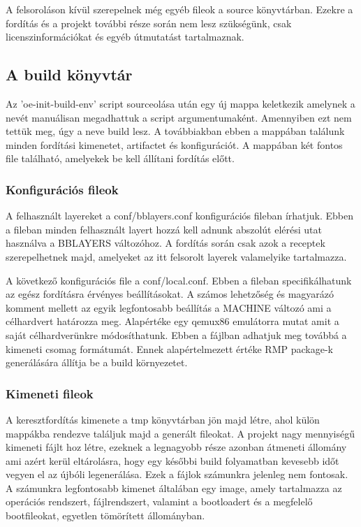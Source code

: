 A felsoroláson kívül szerepelnek még egyéb fileok a source könyvtárban. Ezekre a fordítás és a projekt további része során nem lesz szükségünk, csak licenszinformációkat és egyéb útmutatást tartalmaznak.

\subsection{A build könyvtár}

Az 'oe-init-build-env' script sourceolása után egy új mappa keletkezik amelynek a nevét manuálisan megadhattuk a script argumentumaként. Amennyiben ezt nem tettük meg, úgy a neve build lesz. A továbbiakban ebben a
mappában találunk minden fordítási kimenetet, artifactet és konfigurációt. A mappában két fontos file található, amelyekek be kell állítani fordítás előtt.

\subsubsection{Konfigurációs fileok}

A felhasznált layereket a conf/bblayers.conf konfigurációs fileban írhatjuk. Ebben a fileban minden felhasznált layert hozzá kell adnunk abszolút elérési utat használva a BBLAYERS változóhoz. A fordítás során csak azok a
receptek szerepelhetnek majd, amelyeket az itt felsorolt layerek valamelyike tartalmazza.

A következő konfigurációs file a conf/local.conf. Ebben a fileban specifikálhatunk az egész fordításra érvényes beállításokat. A számos lehetzőség és magyarázó komment mellett az egyik legfontosabb beállítás a
MACHINE változó ami a célhardvert határozza meg. Alapértéke egy qemux86 emulátorra mutat amit a saját célhardverünkre módosíthatunk. Ebben a fájlban adhatjuk meg továbbá a kimeneti csomag formátumát. Ennek
alapértelmezett értéke RMP package-k generálására állítja be a build környezetet.

\subsubsection{Kimeneti fileok}

A keresztfordítás kimenete a tmp könyvtárban jön majd létre, ahol külön mappákba rendezve találjuk majd a generált fileokat. A projekt nagy mennyiségű kimeneti fájlt hoz létre, ezeknek a legnagyobb része azonban átmeneti
állomány ami azért kerül eltárolásra, hogy egy későbbi build folyamatban kevesebb időt vegyen el az újbóli legenerálása. Ezek a fájlok számunkra jelenleg nem fontosak. A számunkra legfontosabb kimenet általában egy image,
amely tartalmazza az operációs rendszert, fájlrendszert, valamint a bootloadert és a megfelelő bootfileokat, egyetlen tömörített állományban.

